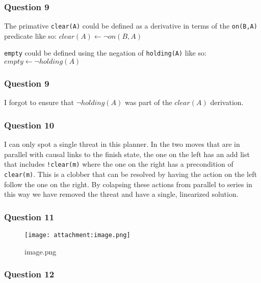 \documentclass[11pt]{article}
\makeatletter
\def\maxwidth{\ifdim\Gin@nat@width>\linewidth\linewidth
    \else\Gin@nat@width\fi}
\let\Oldincludegraphics\includegraphics
\renewcommand{\includegraphics}[1]{\Oldincludegraphics[width=.8\maxwidth]{#1}}
\makeatother
\begin{document}
    \hypertarget{question-9}{%
\subsubsection{Question 9}\label{question-9}}

The primative \texttt{clear(A)} could be defined as a derivative in
terms of the \texttt{on(B,A)} predicate like so:
\(clear(A) \longleftarrow \lnot on(B,A)\)

\texttt{empty} could be defined using the negation of
\texttt{holding(A)} like so: \(empty \longleftarrow \lnot holding(A)\)

    \hypertarget{question-9}{%
\subsubsection{Question 9}\label{question-9}}

I forgot to ensure that \(\lnot holding(A)\) was part of the
\(clear(A)\) derivation.

    \hypertarget{question-10}{%
\subsubsection{Question 10}\label{question-10}}

I can only spot a single threat in this planner. In the two moves that
are in parallel with causal links to the finish state, the one on the
left has an add list that includes \texttt{!clear(m)} where the one on
the right has a precondition of \texttt{clear(m)}. This is a clobber
that can be resolved by having the action on the left follow the one on
the right. By colapsing these actions from parallel to series in this
way we have removed the threat and have a single, linearized solution.

    \hypertarget{question-11}{%
\subsubsection{Question 11}\label{question-11}}

\begin{figure}
\centering
\texttt{[image: attachment:image.png]}
\caption{image.png}
\end{figure}

    \hypertarget{question-12}{%
\subsubsection{Question 12}\label{question-12}}
\end{document}
